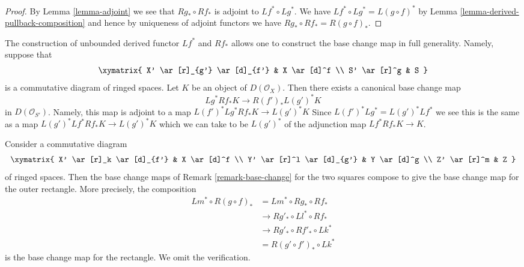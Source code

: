 \begin{proof}
By Lemma \ref{lemma-adjoint} we see that $Rg_* \circ Rf_*$
is adjoint to $Lf^* \circ Lg^*$. We have
$Lf^* \circ Lg^* = L(g \circ f)^*$ by
Lemma \ref{lemma-derived-pullback-composition}
and hence by
uniqueness of adjoint functors we have $Rg_* \circ Rf_* = R(g \circ f)_*$.
\end{proof}

\begin{remark}
\label{remark-base-change}
The construction of unbounded derived functor $Lf^*$ and $Rf_*$
allows one to construct the base change map in full generality.
Namely, suppose that
$$
\xymatrix{
X' \ar[r]_{g'} \ar[d]_{f'} &
X \ar[d]^f \\
S' \ar[r]^g &
S
}
$$
is a commutative diagram of ringed spaces. Let $K$ be an object of
$D(\mathcal{O}_X)$. Then there exists a canonical base change
map
$$
Lg^*Rf_*K \longrightarrow R(f')_*L(g')^*K
$$
in $D(\mathcal{O}_{S'})$. Namely, this map is adjoint to a map
$L(f')^*Lg^*Rf_*K \to L(g')^*K$
Since $L(f')^*Lg^* = L(g')^*Lf^*$ we see this is the same as a map
$L(g')^*Lf^*Rf_*K \to L(g')^*K$
which we can take to be $L(g')^*$ of the adjunction map
$Lf^*Rf_*K \to K$.
\end{remark}

\begin{remark}
\label{remark-compose-base-change}
Consider a commutative diagram
$$
\xymatrix{
X' \ar[r]_k \ar[d]_{f'} & X \ar[d]^f \\
Y' \ar[r]^l \ar[d]_{g'} & Y \ar[d]^g \\
Z' \ar[r]^m & Z
}
$$
of ringed spaces. Then the base change maps of
Remark \ref{remark-base-change}
for the two squares compose to give the base
change map for the outer rectangle. More precisely,
the composition
\begin{align*}
Lm^* \circ R(g \circ f)_*
& =
Lm^* \circ Rg_* \circ Rf_* \\
& \to Rg'_* \circ Ll^* \circ Rf_* \\
& \to Rg'_* \circ Rf'_* \circ Lk^* \\
& = R(g' \circ f')_* \circ Lk^*
\end{align*}
is the base change map for the rectangle. We omit the verification.
\end{remark}

